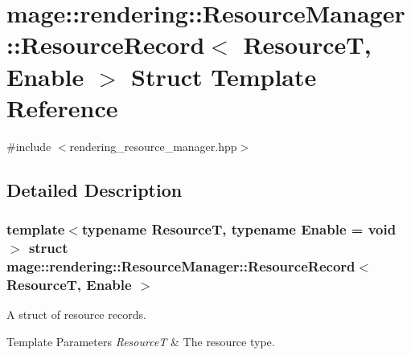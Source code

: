 \hypertarget{structmage_1_1rendering_1_1_resource_manager_1_1_resource_record}{}\section{mage\+:\+:rendering\+:\+:Resource\+Manager\+:\+:Resource\+Record$<$ ResourceT, Enable $>$ Struct Template Reference}
\label{structmage_1_1rendering_1_1_resource_manager_1_1_resource_record}


{\ttfamily \#include $<$rendering\+\_\+resource\+\_\+manager.\+hpp$>$}



\subsection{Detailed Description}
\subsubsection*{template$<$typename ResourceT, typename Enable = void$>$\newline
struct mage\+::rendering\+::\+Resource\+Manager\+::\+Resource\+Record$<$ Resource\+T, Enable $>$}

A struct of resource records.


\begin{DoxyTemplParams}{Template Parameters}
{\em ResourceT} & The resource type. \\
\hline
\end{DoxyTemplParams}
